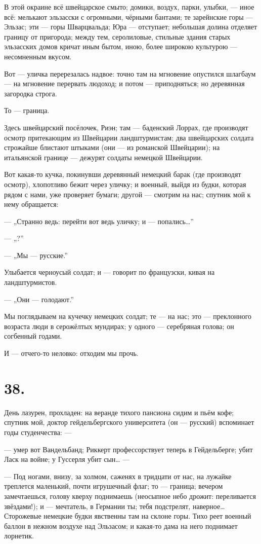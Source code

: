 \documentclass[12pt,a4paper,oneside]{book}
\begin{document}
В этой окраине всё швейцарское смыто; домики, воздух, парки, улыбки, — иное всё: мелькают эльзасски с огромными, чёрными бантами; те зарейнские горы — Эльзас; эти — горы Шварцвальда; Юра — отступает; небольшая долина отделяет границу от пригорода; между тем, серолиловые, стильные здания старых эльзасских домов кричат иным бытом, иною, более широкою культурою — несомненным вкусом.

Вот — уличка перерезалась надвое: точно там на мгновение опустился шлагбаум — на мгновение перервать людоход; и потом — приподняться; но деревянная загородка строга.

То — граница.

Здесь швейцарский посёлочек, Риэн; там — баденский Лоррах, где производят осмотр притекающим из Швейцарии ландштурмистам; два швейцарских солдата строжайше блистают штыками (они — из романской Швейцарии); на итальянской границе — дежурят солдаты немецкой Швейцарии.

Вот какая-то кучка, покинувши деревянный немецкий барак (где производят осмотр), хлопотливо бежит через уличку; и военный, выйдя из будки, которая рядом с нами, уже проверяет бумаги; другой — смотрим на нас; спутник мой к нему обращается:

— „Странно ведь: перейти вот ведь уличку; и — попались…”

— „?”

— „Мы — русские.”

Улыбается черноусый солдат; и — говорит по французски, кивая на ландштурмистов.

— „Они — голодают.”

Мы поглядываем на кучечку немецких солдат; те — на нас; это — преклонного возраста люди в серожёлтых мундирах; у одного — серебряная голова; он согбенный годами.

И — отчего-то неловко: отходим мы прочь.

\section*{38.}

День лазурен, прохладен: на веранде тихого пансиона сидим и пьём кофе; спутник мой, доктор гейдельбергского университета (он — русский) вспоминает годы студенчества: —

— умер вот Вандельбанд; Риккерт профессорствует теперь в Гейдельберге; убит Ласк на войне; у Гуссерля убит сын… —

— Под ногами, внизу, за холмом, саженях в тридцати от нас, на лужайке треплется маленький, почти игрушечный флаг; то — граница; вечером замечтаешься, голову кверху поднимаешь (неосыпное небо дрожит: переливается звёздами!); и — мечтатель, в Германии ты; тебя подстрелят, наверное… Сторожевые немецкие будки явственны там на склоне горы. Тихо реет военный баллон в нежном воздухе над Эльзасом; и какая-то дама на него поднимает лорнетик.
\end{document}
